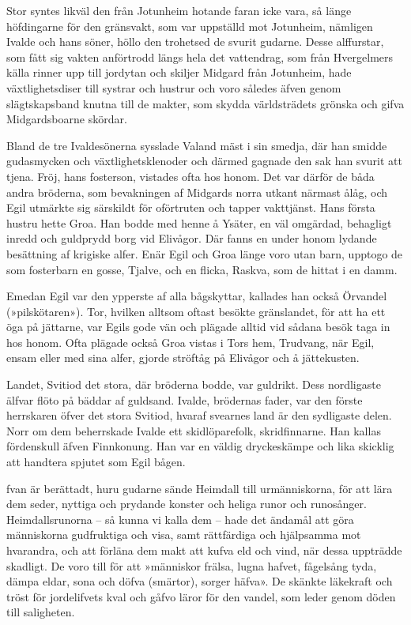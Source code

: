 Stor syntes likväl den från Jotunheim hotande faran icke vara, så länge
höfdingarne för den gränsvakt, som var uppställd mot Jotunheim, nämligen
Ivalde och hans söner, höllo den trohetsed de svurit gudarne. Desse
alffurstar, som fått sig vakten anförtrodd längs hela det vattendrag,
som från
Hvergelmers källa rinner upp till jordytan och skiljer Midgard från
Jotunheim, hade växtlighetsdiser till systrar och hustrur och voro
således äfven genom slägtskapsband knutna till de makter, som skydda
världsträdets grönska och gifva Midgardsboarne skördar.

Bland de tre Ivaldesönerna sysslade Valand mäst i sin smedja, där han
smidde gudasmycken och växtlighetsklenoder och därmed gagnade den sak
han svurit att tjena. Fröj, hans fosterson, vistades ofta hos honom. Det
var därför de båda andra bröderna, som bevakningen af Midgards norra
utkant närmast ålåg, och Egil utmärkte sig särskildt för oförtruten och
tapper vakttjänst. Hans första hustru hette Groa. Han bodde med henne å
Ysäter, en väl omgärdad, behagligt inredd och guldprydd borg vid
Elivågor. Där fanns en under honom lydande besättning af krigiske alfer.
Enär Egil och Groa länge voro utan barn, upptogo de som fosterbarn en
gosse, Tjalve, och en flicka, Raskva, som de hittat i en damm.

Emedan Egil var den ypperste af alla bågskyttar, kallades han också
Örvandel (»pilskötaren»). Tor, hvilken alltsom oftast besökte
gränslandet, för att ha ett öga på jättarne, var Egils gode vän och
plägade alltid vid sådana besök taga in hos honom. Ofta plägade också
Groa vistas i Tors hem, Trudvang, när Egil, ensam eller med sina alfer,
gjorde ströftåg på Elivågor och å jättekusten.

Landet, Svitiod det stora, där bröderna bodde, var guldrikt. Dess
nordligaste älfvar flöto på bäddar af guldsand. Ivalde, brödernas fader,
var den förste herrskaren öfver det stora Svitiod, hvaraf svearnes land
är den sydligaste delen. Norr om dem beherrskade Ivalde ett
skidlöparefolk, skridfinnarne. Han kallas fördenskull äfven Finnkonung.
Han var en väldig dryckeskämpe och lika skicklig att handtera spjutet
som Egil bågen.

\endSecII



\dropcapO fvan är berättadt, huru gudarne sände Heimdall till urmänniskorna, för
att lära dem seder, nyttiga och prydande konster och heliga runor och
runosånger. Heimdallsrunorna -- så kunna vi kalla dem -- hade det
ändamål att göra människorna gudfruktiga och visa, samt rättfärdiga och
hjälpsamma mot hvarandra, och att förläna dem makt att kufva eld och
vind, när dessa uppträdde skadligt. De voro till för att »människor
frälsa, lugna hafvet, fågelsång tyda, dämpa eldar, sona och döfva
(smärtor), sorger häfva». De skänkte läkekraft och tröst för
jordelifvets kval och gåfvo läror för den vandel, som leder genom döden
till saligheten.

